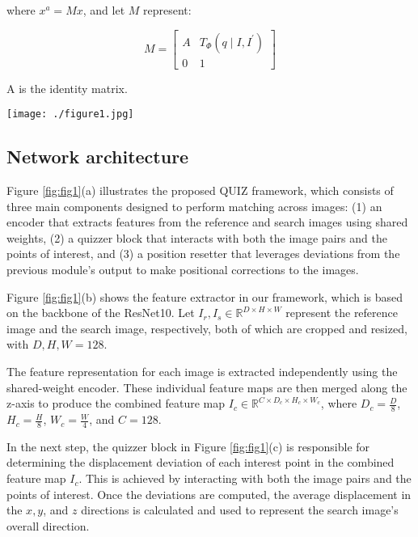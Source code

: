 \documentclass[preprint,review,12pt]{elsarticle}
\begin{document}
where $x^a = Mx$, and let $M$ represent:

\begin{equation}
M=\left[\begin{array}{cc}
A & T_{\Phi}\left(q \mid I, I^{\prime}\right) \\
0 & 1
\end{array}\right]
\end{equation}

A is the identity matrix.

\begin{figure*}[ht]
\centerline{\texttt{[image: ./figure1.jpg]}}
\caption{Structure of the proposed QUIZ for volumetric medical image registration: (a) Workflow for training strategies. (b) Overview of the QUIZ module. (c) Illustration of the quizzer block.}
\label{fig:fig1}
\end{figure*}

\subsection{Network architecture}

Figure \ref{fig:fig1}(a) illustrates the proposed QUIZ framework, which consists of three main components designed to perform matching across images: (1) an encoder that extracts features from the reference and search images using shared weights, (2) a quizzer block that interacts with both the image pairs and the points of interest, and (3) a position resetter that leverages deviations from the previous module's output to make positional corrections to the images.

Figure \ref{fig:fig1}(b) shows the feature extractor in our framework, which is based on the backbone of the ResNet10. Let $I_{r}, I_{s} \in \mathbb{R}^{D \times H \times W}$ represent the reference image and the search image, respectively, both of which are cropped and resized, with $D, H, W = 128$.

The feature representation for each image is extracted independently using the shared-weight encoder. These individual feature maps are then merged along the z-axis to produce the combined feature map $I_{c} \in \mathbb{R}^{C \times D_{c} \times H_{c} \times W_{c}}$, where $D_{c} = \frac{D}{8}$, $H_{c} = \frac{H}{8}$, $W_{c} = \frac{W}{4}$, and $C = 128$.

In the next step, the quizzer block in Figure \ref{fig:fig1}(c) is responsible for determining the displacement deviation of each interest point in the combined feature map $I_{c}$. This is achieved by interacting with both the image pairs and the points of interest. Once the deviations are computed, the average displacement in the $x, y$, and $z$ directions is calculated and used to represent the search image's overall direction.
\end{document}
